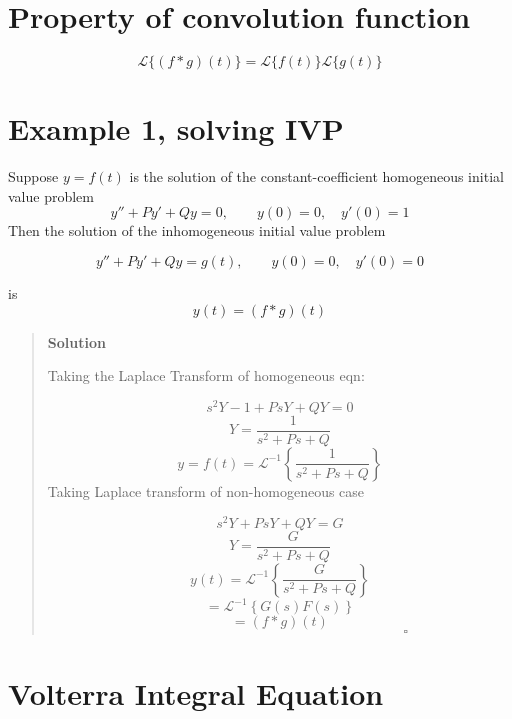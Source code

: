 \documentclass[
  letterpaper,
  DIV=11,
  numbers=noendperiod]{scrreprt}
\theoremstyle{plain}
\theoremstyle{remark}
\begin{document}
\section{Property of convolution
function}\label{property-of-convolution-function}

\[\mathscr{L}\{(f*g)(t)\}=\mathscr{L}\{f(t)\}\mathscr{L}\{g(t)\}\]

\section{Example 1, solving IVP}\label{example-1-solving-ivp}

\begin{tcolorbox}[enhanced jigsaw, title=\textcolor{quarto-callout-tip-color}{\faLightbulb}\hspace{0.5em}{Example}, colbacktitle=quarto-callout-tip-color!10!white, opacitybacktitle=0.6, opacityback=0, rightrule=.15mm, breakable, titlerule=0mm, colback=white, bottomtitle=1mm, colframe=quarto-callout-tip-color-frame, toprule=.15mm, leftrule=.75mm, toptitle=1mm, arc=.35mm, bottomrule=.15mm, left=2mm, coltitle=black]

Suppose \(y=f(t)\) is the solution of the constant-coefficient
homogeneous initial value problem
\[y''+Py'+Qy=0,\qquad y(0)=0,\quad y'(0)=1\] Then the solution of the
inhomogeneous initial value problem

\[y''+Py'+Qy=g(t),\qquad y(0)=0,\quad y'(0)=0\]

is \[y(t)=(f*g)(t)\]

\begin{quote}
\textbf{Solution}

Taking the Laplace Transform of homogeneous eqn:

\[s^2Y-1+PsY+QY=0\] \[Y=\frac{1}{s^2+Ps+Q}\]
\[y=f(t)=\mathscr{L}^{-1}\left\{\frac{1}{s^2+Ps+Q}\right\}\] Taking
Laplace transform of non-homogeneous case

\[s^2Y+PsY+QY=G\] \[Y=\frac{G}{s^2+Ps+Q}\]
\[y(t)=\mathscr{L}^{-1}\left\{\frac{G}{s^2+Ps+Q}\right\}\]
\[=\mathscr{L}^{-1}\left\{G(s)F(s)\right\}\] \[=(f*g)(t)\]
\[\hspace{3in}\square\]
\end{quote}

\end{tcolorbox}

\section{Volterra Integral Equation}\label{volterra-integral-equation}
\end{document}
